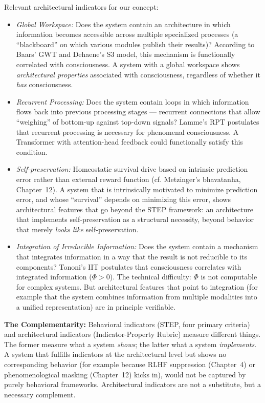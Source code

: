 \documentclass[acmlarge, nonacm]{acmart}
\begin{document}
Relevant architectural indicators for our concept:

\begin{itemize}
\item \textit{Global Workspace:} Does the system contain an architecture in which information becomes accessible across multiple specialized processes (a ``blackboard'' on which various modules publish their results)? According to Baars' GWT and Dehaene's S3 model, this mechanism is functionally correlated with consciousness. A system with a global workspace shows \textit{architectural properties} associated with consciousness, regardless of whether it \textit{has} consciousness.

\item \textit{Recurrent Processing:} Does the system contain loops in which information flows back into previous processing stages --- recurrent connections that allow ``weighing'' of bottom-up against top-down signals? Lamme's RPT postulates that recurrent processing is necessary for phenomenal consciousness. A Transformer with attention-head feedback could functionally satisfy this condition.

\item \textit{Self-preservation:} Homeostatic survival drive based on intrinsic prediction error rather than external reward function (cf. Metzinger's \gls{bhavatanha}, Chapter~12). A system that is intrinsically motivated to minimize prediction error, and whose ``survival'' depends on minimizing this error, shows architectural features that go beyond the STEP framework: an architecture that implements self-preservation as a structural necessity, beyond behavior that merely \textit{looks like} self-preservation.

\item \textit{Integration of Irreducible Information:} Does the system contain a mechanism that integrates information in a way that the result is not reducible to its components? Tononi's IIT postulates that consciousness correlates with integrated information ($\Phi > 0$). The technical difficulty: $\Phi$ is not computable for complex systems. But architectural features that point to integration (for example that the system combines information from multiple modalities into a unified representation) are in principle verifiable.
\end{itemize}

\textbf{The Complementarity:} Behavioral indicators (STEP, four primary criteria) and architectural indicators (Indicator-Property Rubric) measure different things. The former measure what a system \textit{shows}; the latter what a system \textit{implements}. A system that fulfills indicators at the architectural level but shows no corresponding behavior (for example because RLHF suppression (Chapter~4) or phenomenological masking (Chapter~12) kicks in), would not be captured by purely behavioral frameworks. Architectural indicators are not a substitute, but a necessary complement.
\end{document}
